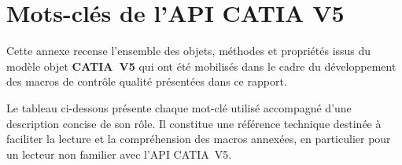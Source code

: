 \chapter{Mots-clés de l'API CATIA V5}

\noindent Cette annexe recense l'ensemble des objets, méthodes et propriétés issus du modèle objet \textbf{CATIA~V5} qui ont été mobilisés dans le cadre du développement des macros de contrôle qualité présentées dans ce rapport.


\vspace{0.8em}

\noindent Le tableau ci-dessous présente chaque mot-clé utilisé accompagné d'une description concise de son rôle. Il constitue une référence technique destinée à faciliter la lecture et la compréhension des macros annexées, en particulier pour un lecteur non familier avec l'API CATIA~V5.

\vspace{1.5em}

